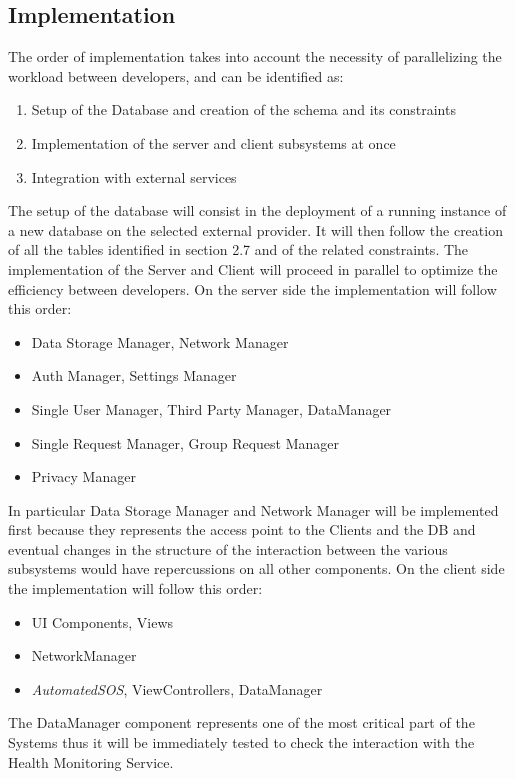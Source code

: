 \documentclass[titlepage]{article}
\begin{document}
\subsection{Implementation}
The order of implementation takes into account the necessity of parallelizing the workload between developers, and can be identified as:
\begin{enumerate}
    \item Setup of the Database and creation of the schema and its constraints
    \item Implementation of the server and client subsystems at once
    \item Integration with external services
\end{enumerate}
The setup of the database will consist in the deployment of a running instance of a new database on the selected external provider. It will then follow the creation of all the tables identified in section 2.7 and of the related constraints. \newline
\newline
The implementation of the Server and Client will proceed in parallel to optimize the efficiency between developers.
\newline
\newline
On the server side the implementation will follow this order:
\begin{itemize}
    \item Data Storage Manager, Network Manager
    \item Auth Manager, Settings Manager
    \item Single User Manager, Third Party Manager, DataManager
    \item Single Request Manager, Group Request Manager
    \item Privacy Manager
\end{itemize}
In particular Data Storage Manager and Network Manager will be implemented first because they represents the access point to the Clients and the DB and eventual changes in the structure of the interaction between the various subsystems would have repercussions on all other components.
\newline
\newline
On the client side the implementation will follow this order:
\begin{itemize}
    \item UI Components, Views
    \item NetworkManager
    \item {\it AutomatedSOS}, ViewControllers, DataManager
\end{itemize}
The DataManager component represents one of the most critical part of the Systems thus it will be immediately tested to check the interaction with the Health Monitoring Service.
\end{document}
